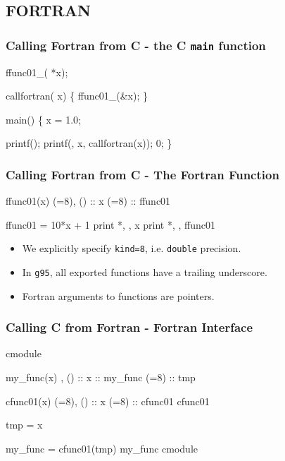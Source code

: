 \documentclass[smaller,table]{beamer} %
\begin{document}
\subsection{FORTRAN}
\begin{frame}[fragile]
\frametitle{Calling Fortran from C - the C {\tt main} function}
\begin{semiverbatim}
\small
{} 

 ffunc01_( *x);

 callfortran( x)
\{
    ffunc01_(&x);
\}

 main()
\{
    x = 1.0;
   
   printf();
   printf(, x, callfortran(x));
    0;
\}
\end{semiverbatim}
\end{frame}

\begin{frame}[fragile]
\frametitle{Calling Fortran from C - The Fortran Function}
\begin{semiverbatim}
\small
{} ffunc01(x)
   (=8), () :: x
   (=8)             :: ffunc01
   
   ffunc01 = 10*x + 1   
   print *, , x
   print *, , ffunc01   
\end{semiverbatim}
\begin{itemize}
\item We explicitly specify {\tt kind=8}, i.e. {\tt double} precision.
\item In {\tt g95}, all exported functions have a trailing underscore.
\item Fortran arguments to functions are pointers.
\end{itemize}
\end{frame}

\begin{frame}[fragile]
\frametitle{Calling C from Fortran - Fortran Interface}
\begin{semiverbatim}
\scriptsize
{} cmodule

    my_func(x)
      , () :: x
                   :: my_func
      (=8)     :: tmp
            
          cfunc01(x)
            (=8), () :: x
            (=8)             :: cfunc01
          cfunc01
      
      tmp = x
                  
      my_func = cfunc01(tmp)
    my_func
 cmodule
\end{semiverbatim}
\end{frame}
\end{document}
